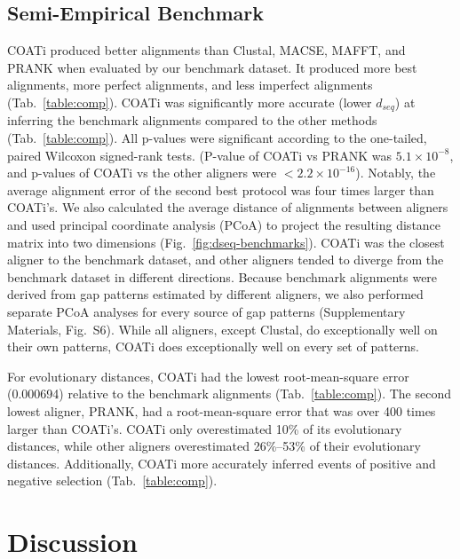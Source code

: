 \documentclass[12pt,letterpaper]{article}
\begin{document}
\subsection*{Semi-Empirical Benchmark}

COATi produced better alignments than Clustal\textOmega{}, MACSE, MAFFT, and PRANK when evaluated by our benchmark dataset. It produced more best alignments, more perfect alignments, and less imperfect alignments (Tab.~\ref{table:comp}).
%
COATi was significantly more accurate (lower $d_{seq}$) at inferring the benchmark alignments compared to the other methods (Tab.~\ref{table:comp}). All p-values were significant according to the one-tailed, paired Wilcoxon signed-rank tests. (P-value of COATi vs PRANK was $5.1 \times 10^{-8}$, and p-values of COATi vs the other aligners were $< 2.2 \times 10^{-16}$). Notably, the average alignment error of the second best protocol was four times larger than COATi's. We also calculated the average distance of alignments between aligners and used principal coordinate analysis (PCoA) to project the resulting distance matrix into two dimensions (Fig.~\ref{fig:dseq-benchmarks}). COATi was the closest aligner to the benchmark dataset, and other aligners tended to diverge from the benchmark dataset in different directions. Because benchmark alignments were derived from gap patterns estimated by different aligners, we also performed separate PCoA analyses for every source of gap patterns (Supplementary Materials, Fig.~S6). While all aligners, except Clustal\textOmega{}, do exceptionally well on their own patterns, COATi does exceptionally well on every set of patterns.

For evolutionary distances, COATi had the lowest root-mean-square error (0.000694) relative to the benchmark alignments (Tab.~\ref{table:comp}). The second lowest aligner, PRANK, had a root-mean-square error that was over 400 times larger than COATi's. COATi only overestimated  10\% of its evolutionary distances, while other aligners overestimated 26\%--53\% of their evolutionary distances.
%
Additionally, COATi more accurately inferred events of positive and negative selection (Tab.~\ref{table:comp}).

\section*{Discussion}
\end{document}
